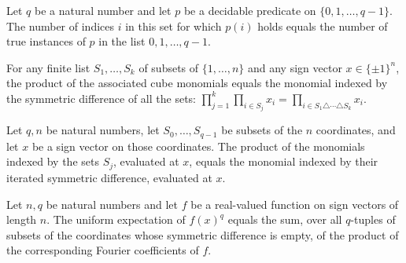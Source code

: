 \begin{theorem}
\label{FABL.natCard_subtype_eq_countP_ofFn}
\leanok
{}
Let $q$ be a natural number and let $p$ be a decidable predicate on
$\{0,1,\ldots,q-1\}$. The number of indices $i$ in this set for which $p(i)$ holds
equals the number of true instances of $p$ in the list $0,1,\ldots,q-1$.
\end{theorem}

\begin{theorem}
\label{FABL.list_prod_monomial}
\leanok
{}
For any finite list $S_1,\ldots,S_k$ of subsets of $\{1,\ldots,n\}$ and any sign vector
$x\in\{\pm1\}^n$, the product of the associated cube monomials equals the monomial
indexed by the symmetric difference of all the sets: $\prod_{j=1}^k\prod_{i\in
S_j}x_i=\prod_{i\in S_1\triangle\cdots\triangle S_k}x_i$.
\end{theorem}

\begin{theorem}
\label{FABL.prod_monomial_eq_tupleSymmDiff}
\leanok
{}
Let $q,n$ be natural numbers, let $S_0,\ldots,S_{q-1}$ be subsets of the $n$
coordinates, and let $x$ be a sign vector on those coordinates. The product of the
monomials indexed by the sets $S_j$, evaluated at $x$, equals the monomial indexed by
their iterated symmetric difference, evaluated at $x$.
\end{theorem}

\begin{theorem}
\label{FABL.expect_pow_eq_sum_fourierCoeff_of_tupleSymmDiff_empty}
\leanok
{}
Let $n,q$ be natural numbers and let $f$ be a real-valued function on sign vectors of
length $n$. The uniform expectation of $f(x)^q$ equals the sum, over all $q$-tuples of
subsets of the coordinates whose symmetric difference is empty, of the product of the
corresponding Fourier coefficients of $f$.
\end{theorem}

